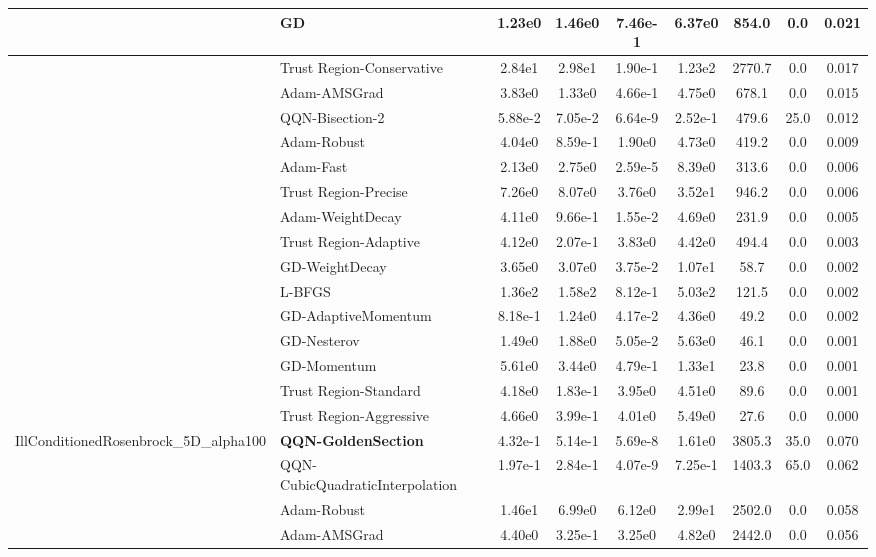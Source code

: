 \documentclass[10pt]{article}
\begin{document}
\begin{longtable}{|l|l|c|c|c|c|c|c|c|}
\hline
 & GD & 1.23e0 & 1.46e0 & 7.46e-1 & 6.37e0 & 854.0 & 0.0 & 0.021 \\
\hline
 & Trust Region-Conservative & 2.84e1 & 2.98e1 & 1.90e-1 & 1.23e2 & 2770.7 & 0.0 & 0.017 \\
\hline
 & Adam-AMSGrad & 3.83e0 & 1.33e0 & 4.66e-1 & 4.75e0 & 678.1 & 0.0 & 0.015 \\
\hline
 & QQN-Bisection-2 & 5.88e-2 & 7.05e-2 & 6.64e-9 & 2.52e-1 & 479.6 & 25.0 & 0.012 \\
\hline
 & Adam-Robust & 4.04e0 & 8.59e-1 & 1.90e0 & 4.73e0 & 419.2 & 0.0 & 0.009 \\
\hline
 & Adam-Fast & 2.13e0 & 2.75e0 & 2.59e-5 & 8.39e0 & 313.6 & 0.0 & 0.006 \\
\hline
 & Trust Region-Precise & 7.26e0 & 8.07e0 & 3.76e0 & 3.52e1 & 946.2 & 0.0 & 0.006 \\
\hline
 & Adam-WeightDecay & 4.11e0 & 9.66e-1 & 1.55e-2 & 4.69e0 & 231.9 & 0.0 & 0.005 \\
\hline
 & Trust Region-Adaptive & 4.12e0 & 2.07e-1 & 3.83e0 & 4.42e0 & 494.4 & 0.0 & 0.003 \\
\hline
 & GD-WeightDecay & 3.65e0 & 3.07e0 & 3.75e-2 & 1.07e1 & 58.7 & 0.0 & 0.002 \\
\hline
 & L-BFGS & 1.36e2 & 1.58e2 & 8.12e-1 & 5.03e2 & 121.5 & 0.0 & 0.002 \\
\hline
 & GD-AdaptiveMomentum & 8.18e-1 & 1.24e0 & 4.17e-2 & 4.36e0 & 49.2 & 0.0 & 0.002 \\
\hline
 & GD-Nesterov & 1.49e0 & 1.88e0 & 5.05e-2 & 5.63e0 & 46.1 & 0.0 & 0.001 \\
\hline
 & GD-Momentum & 5.61e0 & 3.44e0 & 4.79e-1 & 1.33e1 & 23.8 & 0.0 & 0.001 \\
\hline
 & Trust Region-Standard & 4.18e0 & 1.83e-1 & 3.95e0 & 4.51e0 & 89.6 & 0.0 & 0.001 \\
\hline
 & Trust Region-Aggressive & 4.66e0 & 3.99e-1 & 4.01e0 & 5.49e0 & 27.6 & 0.0 & 0.000 \\
IllConditionedRosenbrock\_5D\_alpha100 & \textbf{QQN-GoldenSection} & 4.32e-1 & 5.14e-1 & 5.69e-8 & 1.61e0 & 3805.3 & 35.0 & 0.070 \\
\hline
 & QQN-CubicQuadraticInterpolation & 1.97e-1 & 2.84e-1 & 4.07e-9 & 7.25e-1 & 1403.3 & 65.0 & 0.062 \\
\hline
 & Adam-Robust & 1.46e1 & 6.99e0 & 6.12e0 & 2.99e1 & 2502.0 & 0.0 & 0.058 \\
\hline
 & Adam-AMSGrad & 4.40e0 & 3.25e-1 & 3.25e0 & 4.82e0 & 2442.0 & 0.0 & 0.056 \\

\end{longtable}
\end{document}
